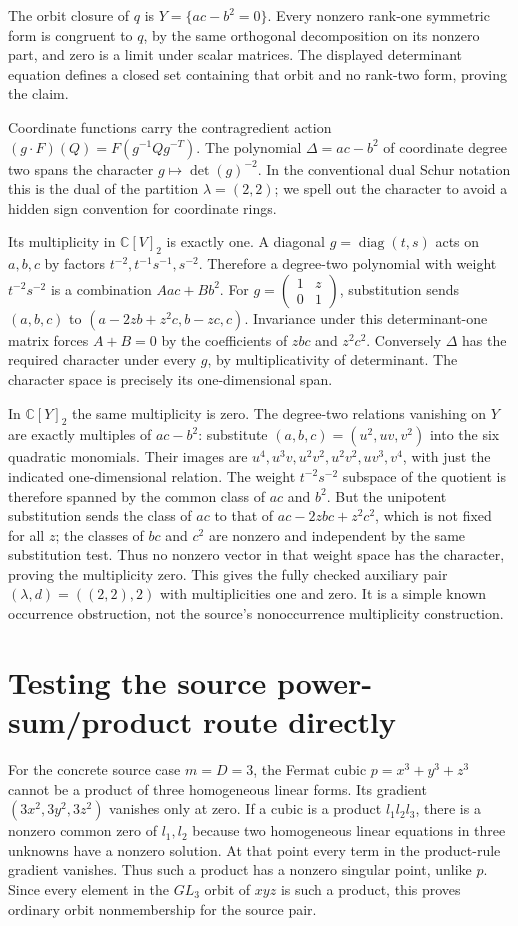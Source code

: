 \documentclass[11pt]{article}
\begin{document}
The orbit closure of $q$ is $Y=\{ac-b^2=0\}$. Every nonzero
rank-one symmetric form is congruent to $q$, by the same orthogonal
decomposition on its nonzero part, and zero is a limit under scalar
matrices. The displayed determinant equation defines a closed set
containing that orbit and no rank-two form, proving the claim.

Coordinate functions carry the contragredient action
$(g\cdot F)(Q)=F(g^{-1}Qg^{-T})$. The polynomial
$\Delta=ac-b^2$ of coordinate degree two spans the character
$g\mapsto\det(g)^{-2}$. In the conventional dual Schur notation
this is the dual of the partition $\lambda=(2,2)$; we spell out
the character to avoid a hidden sign convention for coordinate rings.

Its multiplicity in $\mathbb C[V]_2$ is exactly one. A diagonal
$g=\operatorname{diag}(t,s)$ acts on $a,b,c$ by factors
$t^{-2},t^{-1}s^{-1},s^{-2}$. Therefore a degree-two polynomial
with weight $t^{-2}s^{-2}$ is a combination $Aac+Bb^2$.
For $g=\left(\begin{smallmatrix}1&z\\0&1\end{smallmatrix}\right)$,
substitution sends $(a,b,c)$ to $(a-2zb+z^2c,b-zc,c)$.
Invariance under this determinant-one matrix forces $A+B=0$ by
the coefficients of $zbc$ and $z^2c^2$. Conversely $\Delta$
has the required character under every $g$, by multiplicativity
of determinant. The character space is precisely its one-dimensional span.

In $\mathbb C[Y]_2$ the same multiplicity is zero. The degree-two
relations vanishing on $Y$ are exactly multiples of $ac-b^2$:
substitute $(a,b,c)=(u^2,uv,v^2)$ into the six quadratic monomials.
Their images are $u^4,u^3v,u^2v^2,u^2v^2,uv^3,v^4$, with just
the indicated one-dimensional relation. The weight $t^{-2}s^{-2}$
subspace of the quotient is therefore spanned by the common class
of $ac$ and $b^2$. But the unipotent substitution sends the class
of $ac$ to that of $ac-2zbc+z^2c^2$, which is not fixed for all
$z$; the classes of $bc$ and $c^2$ are nonzero and independent
by the same substitution test. Thus no nonzero vector in that
weight space has the character, proving the multiplicity zero.
This gives the fully checked auxiliary pair $(\lambda,d)=((2,2),2)$
with multiplicities one and zero. It is a simple known occurrence
obstruction, not the source's nonoccurrence multiplicity construction.

\section{Testing the source power-sum/product route directly}
For the concrete source case $m=D=3$, the Fermat cubic
$p=x^3+y^3+z^3$ cannot be a product of three homogeneous linear
forms. Its gradient $(3x^2,3y^2,3z^2)$ vanishes only at zero.
If a cubic is a product $l_1l_2l_3$, there is a nonzero common
zero of $l_1,l_2$ because two homogeneous linear equations in three
unknowns have a nonzero solution. At that point every term in
the product-rule gradient vanishes. Thus such a product has a
nonzero singular point, unlike $p$. Since every element in the
$GL_3$ orbit of $xyz$ is such a product, this proves ordinary
orbit nonmembership for the source pair.
\end{document}
